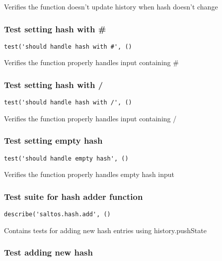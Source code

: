 \documentclass[a4paper]{article}
\begin{document}
Verifies the function doesn't update history when hash doesn't change

\hypertarget{toc642}{}
\subsubsection{Test setting hash with \#}

\begin{lstlisting}
test('should handle hash with #', ()
\end{lstlisting}

Verifies the function properly handles input containing \#

\hypertarget{toc643}{}
\subsubsection{Test setting hash with /}

\begin{lstlisting}
test('should handle hash with /', ()
\end{lstlisting}

Verifies the function properly handles input containing /

\hypertarget{toc644}{}
\subsubsection{Test setting empty hash}

\begin{lstlisting}
test('should handle empty hash', ()
\end{lstlisting}

Verifies the function properly handles empty hash input

\hypertarget{toc645}{}
\subsubsection{Test suite for hash adder function}

\begin{lstlisting}
describe('saltos.hash.add', ()
\end{lstlisting}

Contains tests for adding new hash entries
using history.pushState

\hypertarget{toc646}{}
\subsubsection{Test adding new hash}
\end{document}

